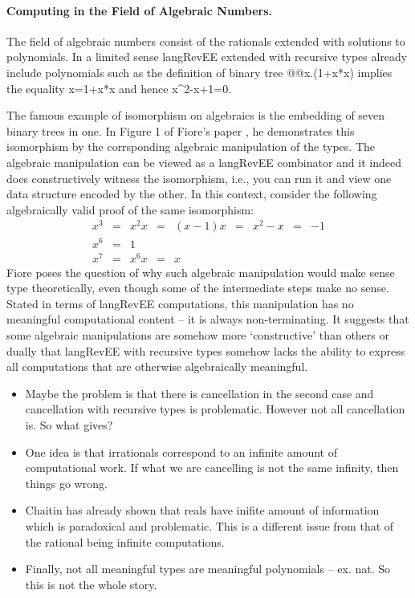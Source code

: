 \documentclass[preprint]{sigplanconf}
\begin{document}
\paragraph*{Computing in the Field of Algebraic Numbers.}
\label{sec:algebraic-field}
The field of algebraic numbers consist of the rationals extended with
solutions to polynomials. In a limited sense {{langRevEE}} extended
with recursive types already include polynomials such as the
definition of binary tree {{@@x.(1+x*x)}} implies the equality
{{x=1+x*x}} and hence {{x^2-x+1=0}}. 

The famous example of isomorphism on algebraics is the embedding of
seven binary trees in one. In Figure 1 of Fiore's paper
\cite{Fiore:2004}, he demonstrates this isomorphism by the
corrsponding algebraic manipulation of the types.  The algebraic
manipulation can be viewed as a {{langRevEE}} combinator and it indeed
does constructively witness the isomorphism, i.e., you can run it and
view one data structure encoded by the other. In this context,
consider the following algebraically valid proof of the same
isomorphism:
\[\begin{array}{rclclclcl}
x^3 &=& x^2 x &=& (x-1) x &=& x^2 - x &=& -1 \\
x^6 &=& 1 \\
x^7 &=& x^6 x &=& x
\end{array}\]
Fiore poses the question of why such algebraic manipulation would make
sense type theoretically, even though some of the intermediate steps
make no sense.  Stated in terms of {{langRevEE}} computations, this
manipulation has no meaningful computational content -- it is always
non-terminating. It suggests that some algebraic manipulations are
somehow more `constructive' than others or dually that {{langRevEE}}
with recursive types somehow lacks the ability to express all
computations that are otherwise algebraically meaningful.

\begin{itemize}
\item Maybe the problem is that there is cancellation in the second
  case and cancellation with recursive types is problematic. However
  not all cancellation is. So what gives?

\item One idea is that irrationals correspond to an infinite amount of
  computational work. If what we are cancelling is not the same
  infinity, then things go wrong. 

\item Chaitin has already shown that reals have inifite amount of
  information which is paradoxical and problematic. This is a
  different issue from that of the rational being infinite
  computations.

\item Finally, not all meaningful types are meaningful polynomials --
  ex. nat. So this is not the whole story. 

\end{itemize}
\end{document}
